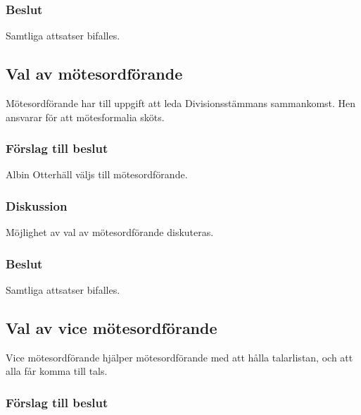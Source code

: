\documentclass[protokoll]{dvd}
\begin{document}
\subsubsection{Beslut}
\begin{attsatser}
	\item Samtliga attsatser bifalles.
\end{attsatser}

\subsection{Val av mötesordförande}

Mötesordförande har till uppgift att leda Divisionsstämmans sammankomst.
Hen ansvarar för att mötesformalia sköts.

\subsubsection*{Förslag till beslut}

\begin{attsatser}
	\item Albin Otterhäll väljs till mötesordförande.
\end{attsatser}

\subsubsection{Diskussion}
Möjlighet av val av mötesordförande diskuteras.

\subsubsection{Beslut}
\begin{attsatser}
	\item Samtliga attsatser bifalles.
\end{attsatser}

\subsection{Val av vice mötesordförande}

Vice mötesordförande hjälper mötesordförande med att hålla talarlistan, och att alla får komma till tals.

\subsubsection*{Förslag till beslut}
\end{document}
